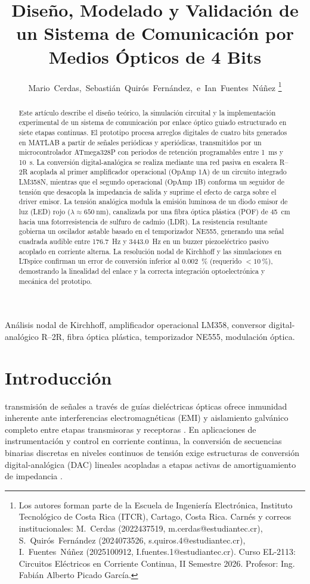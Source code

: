 \documentclass[journal,transmag]{IEEEtran}
\title{Diseño, Modelado y Validación de un Sistema de Comunicación por Medios Ópticos de 4 Bits}
\author{Mario~Cerdas,~Sebastián~Quirós~Fernández,~e~Ian~Fuentes~Núñez%
\thanks{Los autores forman parte de la Escuela de Ingeniería Electrónica, Instituto Tecnológico de Costa Rica (ITCR), Cartago, Costa Rica. Carnés y correos institucionales: M.~Cerdas (2022437519, m.cerdas@estudiantec.cr), S.~Quirós~Fernández (2024073526, s.quiros.4@estudiantec.cr), I.~Fuentes~Núñez (2025100912, I.fuentes.1@estudiantec.cr). Curso EL-2113: Circuitos Eléctricos en Corriente Continua, II Semestre 2026. Profesor: Ing. Fabián Alberto Picado García.}}
\begin{document}
\maketitle

\begin{abstract}
Este artículo describe el diseño teórico, la simulación circuital y la implementación experimental de un sistema de comunicación por enlace óptico guiado estructurado en siete etapas continuas. El prototipo procesa arreglos digitales de cuatro bits generados en MATLAB a partir de señales periódicas y aperiódicas, transmitidos por un microcontrolador ATmega328P con periodos de retención programables entre \SI{1}{\milli\second} y \SI{10}{\second}. La conversión digital-analógica se realiza mediante una red pasiva en escalera R--2R acoplada al primer amplificador operacional (OpAmp 1A) de un circuito integrado LM358N, mientras que el segundo operacional (OpAmp 1B) conforma un seguidor de tensión que desacopla la impedancia de salida y suprime el efecto de carga sobre el driver emisor. La tensión analógica modula la emisión luminosa de un diodo emisor de luz (LED) rojo ($\lambda \approx \SI{650}{\nano\meter}$), canalizada por una fibra óptica plástica (POF) de \SI{45}{\centi\meter} hacia una fotorresistencia de sulfuro de cadmio (LDR). La resistencia resultante gobierna un oscilador astable basado en el temporizador NE555, generando una señal cuadrada audible entre \SI{176.7}{\hertz} y \SI{3443.0}{\hertz} en un buzzer piezoeléctrico pasivo acoplado en corriente alterna. La resolución nodal de Kirchhoff y las simulaciones en LTspice confirman un error de conversión inferior al \SI{0.002}{\percent} (requerido $< \SI{10}{\percent}$), demostrando la linealidad del enlace y la correcta integración optoelectrónica y mecánica del prototipo.
\end{abstract}

\begin{IEEEkeywords}
Análisis nodal de Kirchhoff, amplificador operacional LM358, conversor digital-analógico R--2R, fibra óptica plástica, temporizador NE555, modulación óptica.
\end{IEEEkeywords}

\section{Introducción}
 transmisión de señales a través de guías dieléctricas ópticas ofrece inmunidad inherente ante interferencias electromagnéticas (EMI) y aislamiento galvánico completo entre etapas transmisoras y receptoras \cite{kasap2013,ziemann2008}. En aplicaciones de instrumentación y control en corriente continua, la conversión de secuencias binarias discretas en niveles continuos de tensión exige estructuras de conversión digital-analógica (DAC) lineales acopladas a etapas activas de amortiguamiento de impedancia \cite{franco2015,sedra2020}.
\end{document}
